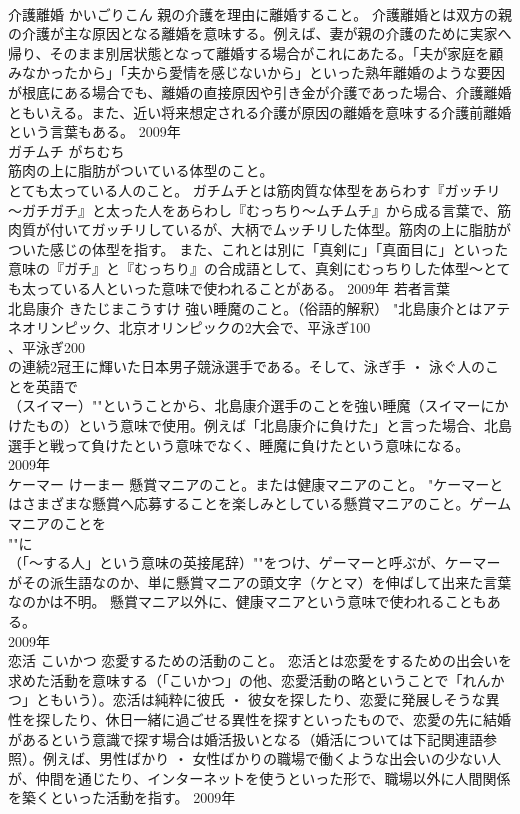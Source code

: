 \documentclass[8pt]{extreport}
\begin{document}
\begin{CJK}{UTF8}{min}
\\	介護離婚	かいごりこん	親の介護を理由に離婚すること。	介護離婚とは双方の親の介護が主な原因となる離婚を意味する。例えば、妻が親の介護のために実家へ帰り、そのまま別居状態となって離婚する場合がこれにあたる。「夫が家庭を顧みなかったから」「夫から愛情を感じないから」といった熟年離婚のような要因が根底にある場合でも、離婚の直接原因や引き金が介護であった場合、介護離婚ともいえる。また、近い将来想定される介護が原因の離婚を意味する介護前離婚という言葉もある。	2009年	
\\	ガチムチ	がちむち	
\\	筋肉の上に脂肪がついている体型のこと。 
\\	とても太っている人のこと。	ガチムチとは筋肉質な体型をあらわす『ガッチリ～ガチガチ』と太った人をあらわし『むっちり～ムチムチ』から成る言葉で、筋肉質が付いてガッチリしているが、大柄でムッチリした体型。筋肉の上に脂肪がついた感じの体型を指す。 また、これとは別に「真剣に」「真面目に」といった意味の『ガチ』と『むっちり』の合成語として、真剣にむっちりした体型～とても太っている人といった意味で使われることがある。	2009年	若者言葉	
\\	北島康介	きたじまこうすけ	強い睡魔のこと。（俗語的解釈）	"北島康介とはアテネオリンピック、北京オリンピックの2大会で、平泳ぎ100
\\	、平泳ぎ200
\\	の連続2冠王に輝いた日本男子競泳選手である。そして、泳ぎ手 ・ 泳ぐ人のことを英語で
\\	（スイマー）""ということから、北島康介選手のことを強い睡魔（スイマーにかけたもの）という意味で使用。例えば「北島康介に負けた」と言った場合、北島選手と戦って負けたという意味でなく、睡魔に負けたという意味になる。
\\	2009年	
\\	ケーマー	けーまー	懸賞マニアのこと。または健康マニアのこと。	"ケーマーとはさまざまな懸賞へ応募することを楽しみとしている懸賞マニアのこと。ゲームマニアのことを
\\	""に
\\	（「～する人」という意味の英接尾辞）""をつけ、ゲーマーと呼ぶが、ケーマーがその派生語なのか、単に懸賞マニアの頭文字（ケとマ）を伸ばして出来た言葉なのかは不明。 懸賞マニア以外に、健康マニアという意味で使われることもある。
\\	2009年	
\\	恋活	こいかつ	恋愛するための活動のこと。	恋活とは恋愛をするための出会いを求めた活動を意味する（「こいかつ」の他、恋愛活動の略ということで「れんかつ」ともいう）。恋活は純粋に彼氏 ・ 彼女を探したり、恋愛に発展しそうな異性を探したり、休日一緒に過ごせる異性を探すといったもので、恋愛の先に結婚があるという意識で探す場合は婚活扱いとなる（婚活については下記関連語参照）。例えば、男性ばかり ・ 女性ばかりの職場で働くような出会いの少ない人が、仲間を通じたり、インターネットを使うといった形で、職場以外に人間関係を築くといった活動を指す。	2009年	

\end{CJK}
\end{document}
